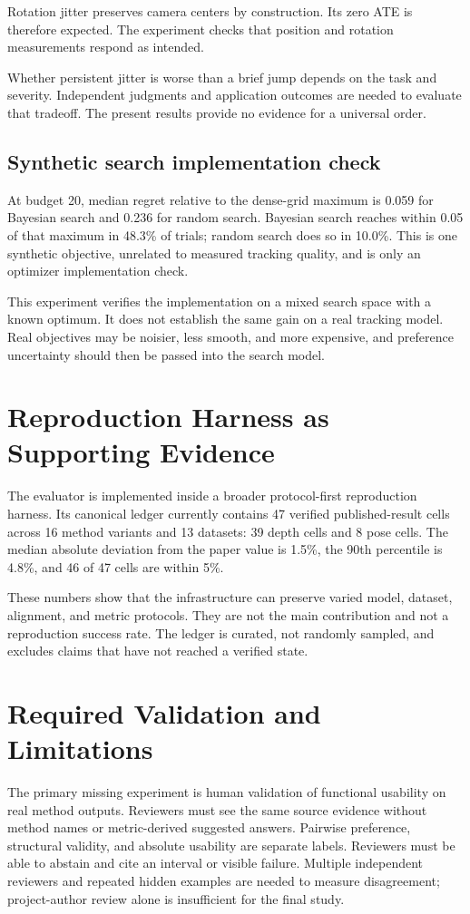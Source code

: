 \documentclass[10pt,twocolumn]{article}
\begin{document}
Rotation jitter preserves camera centers by construction. Its zero ATE is therefore expected. The experiment checks that position and rotation measurements respond as intended.

Whether persistent jitter is worse than a brief jump depends on the task and severity. Independent judgments and application outcomes are needed to evaluate that tradeoff. The present results provide no evidence for a universal order.

\subsection{Synthetic search implementation check}
At budget 20, median regret relative to the dense-grid maximum is 0.059 for Bayesian search and 0.236 for random search. Bayesian search reaches within 0.05 of that maximum in 48.3\% of trials; random search does so in 10.0\%. This is one synthetic objective, unrelated to measured tracking quality, and is only an optimizer implementation check.

This experiment verifies the implementation on a mixed search space with a known optimum. It does not establish the same gain on a real tracking model. Real objectives may be noisier, less smooth, and more expensive, and preference uncertainty should then be passed into the search model.

\section{Reproduction Harness as Supporting Evidence}
The evaluator is implemented inside a broader protocol-first reproduction harness. Its canonical ledger currently contains 47 verified published-result cells across 16 method variants and 13 datasets: 39 depth cells and 8 pose cells. The median absolute deviation from the paper value is 1.5\%, the 90th percentile is 4.8\%, and 46 of 47 cells are within 5\%.

These numbers show that the infrastructure can preserve varied model, dataset, alignment, and metric protocols. They are not the main contribution and not a reproduction success rate. The ledger is curated, not randomly sampled, and excludes claims that have not reached a verified state.

\section{Required Validation and Limitations}
The primary missing experiment is human validation of functional usability on real method outputs. Reviewers must see the same source evidence without method names or metric-derived suggested answers. Pairwise preference, structural validity, and absolute usability are separate labels. Reviewers must be able to abstain and cite an interval or visible failure. Multiple independent reviewers and repeated hidden examples are needed to measure disagreement; project-author review alone is insufficient for the final study.
\end{document}
